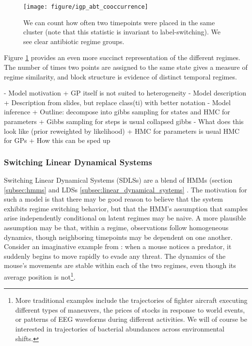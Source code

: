 \documentclass{article}
\begin{document}
\begin{figure}[ht]
  \centering
  \texttt{[image: figure/igp\_abt\_cooccurrence]}
  \caption{We can count how often two timepoints were placed in the same cluster
    (note that this statistic is invariant to label-switching). We see clear
    antibiotic regime groups. \label{fig:igp_abt_cooccurrence}}
\end{figure}

Figure \ref{fig:igp_abt_cooccurrence} provides an even more succinct
representation of the different regimes. The number of times two points are
assigned to the same state gives a measure of regime similarity, and block
structure is evidence of distinct temporal regimes.

- Model motivation
    + GP itself is not suited to heterogeneity
- Model description
    + Description from slides, but replace class(ti) with better notation
- Model inference
    + Outline: decompose into gibbs sampling for states and HMC for parameters
    + Gibbs sampling for steps is usual collapsed gibbs
      - What does this look like (prior reweighted by likelihood)
    + HMC for parameters is usual HMC for GPs
    + How this can be sped up


\subsubsection{Switching Linear Dynamical Systems}
\label{subsubsec:switching_dynamical}

Switching Linear Dynamical Systems (SDLSs) are a blend of HMMs (section
\ref{subsec:hmms} and LDSs \ref{subsec:linear_dynamical_systems}
  \citep{ghahramani1998variational, linderman2016recurrent}. The motivation for
  such a model is that there may be good reason to believe that the system
  exhibits regime switching behavior, but that the HMM's assumption that samples
  arise independently conditional on latent regimes may be naive. A more
  plausible assumption may be that, within a regime, observations follow
  homogeneous dynamics, though neighboring timepoints may be dependent on one
  another. Consider an imaginative example from \citep{linderman2016recurrent}:
  when a mouse notices a predator, it suddenly begins to move rapidly to evade
  any threat. The dynamics of the mouse's movements are stable within each of
  the two regimes, even though its average position is not\footnote{More
    traditional examples include the trajectories of fighter aircraft executing
    different types of maneuvers, the prices of stocks in response to world
    events, or patterns of EEG waveforms during different activities. We will of
    course be interested in trajectories of bacterial abundances across
    environmental shifts.}.
\end{document}

